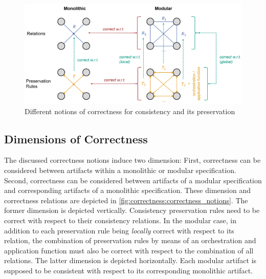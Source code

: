 \begin{figure}
    \centering
    \includegraphics[width=\textwidth]{figures/correctness/notion/correctness_notions.png}
    \caption[Notions of correctness for consistency and its preservation]{Different notions of correctness for consistency and its preservation}
    \label{fig:correctness:correctness_notions}
\end{figure}


\subsection{Dimensions of Correctness}
\label{chap:correctness:notions_correctness:dimensions}

The discussed correctness notions induce two dimension: First, correctness can be considered between artifacts within a monolithic or modular specification. Second, correctness can be considered between artifacts of a modular specification and corresponding artifacts of a monolithic specification. These dimension and correctness relations are depicted in \autoref{fig:correctness:correctness_notions}.
The former dimension is depicted vertically. Consistency preservation rules need to be correct with respect to their consistency relations.
In the modular case, in addition to each preservation rule being \emph{locally} correct with respect to its relation, the combination of preservation rules by means of an orchestration and application function must also be correct with respect to the combination of all relations.
The latter dimension is depicted horizontally. Each modular artifact is supposed to be consistent with respect to its corresponding monolithic artifact.

